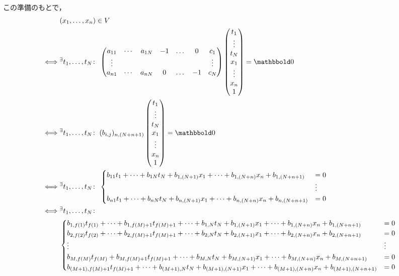 \begin{itemize}
この準備のもとで，
\begin{align}
& (x_1,\dots, x_n) \in V\\
\iff &
\Exists{t_1,\dots,t_N}
\begin{pmatrix}
 a_{11} & \cdots & a_{1N} & -1 & \dots & 0 & c_1\\
 \vdots& & & & & & \vdots\\
 a_{n1} & \cdots & a_{nN} & 0 & \dots & -1 & c_N
\end{pmatrix}
\tatev{t_1 \\ \vdots \\ t_N \\ x_1 \\ \vdots \\ x_n \\ 1}
 =
\bbold{0}\\
\iff &
\Exists{t_1,\dots,t_N} (b_{i,j})_{n,(N+n+1)}
 \tatev{t_1 \\ \vdots \\ t_N \\ x_1 \\ \vdots \\ x_n \\ 1}
 =
\bbold{0}\\
\iff &
\Exists{t_1,\dots,t_N}
\begin{cases}
 b_{11}t_1 + \dots + b_{1N}t_N + b_{1,(N+1)} x_1 + \dots + b_{1,(N+n)} x_n + b_{1,(N+n+1)} &= 0 \\
&\vdots\\
 b_{n1}t_1 + \dots + b_{nN}t_N + b_{n,(N+1)} x_1 + \dots + b_{n,(N+n)} x_n + b_{n,(N+n+1)} &= 0
\end{cases}\\
\iff &
\Exists{t_1,\dots,t_N} \\
&\begin{cases}
 b_{1,f(1)} t_{f(1)} + \dots + b_{1,f(M)+1}t_{f(M)+1} + \dots + b_{1,N}t_N + b_{1,(N+1)} x_1 + \dots + b_{1,(N+n)} x_n + b_{1,(N+n+1)} &= 0 \\
 b_{2,f(2)} t_{f(2)} + \dots + b_{2,f(M)+1}t_{f(M)+1} + \dots + b_{2,N}t_N + b_{2,(N+1)} x_1 + \dots + b_{2,(N+n)} x_n + b_{2,(N+n+1)} &= 0 \\
\vdots&\vdots \\
 b_{M,f(M)} t_{f(M)} +  b_{M,f(M)+1}t_{f(M)+1} + \dots + b_{M,N}t_N + b_{M,(N+1)} x_1 + \dots + b_{M,(N+n)} x_n + b_{M,(N+n+1)} &= 0 \\
b_{(M+1),f(M)+1}t_{f(M)+1} + \dots + b_{(M+1),N}t_N + b_{(M+1),(N+1)}x_1 + \dots + b_{(M+1),(N+n)}x_n + b_{(M+1),(N+n+1)} &= 0\\

\end{cases}
\end{align}
\end{itemize}
